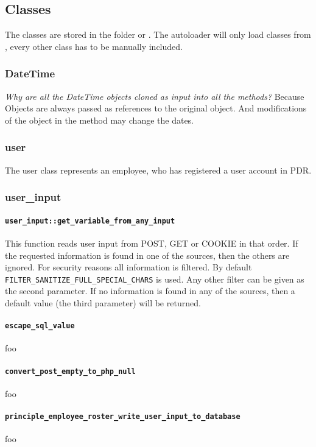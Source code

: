 \subsection{Classes}
The classes are stored in the folder  or .
The autoloader will only load classes from , every other class has to be manually included.

\subsubsection{DateTime}
\emph{Why are all the DateTime objects cloned as input into all the methods?}
Because Objects are always passed as references to the original object.
And modifications of the object in the method may change the dates.

\subsubsection{user}
The user class represents an employee, who has registered a user account in PDR.

\subsubsection{user\_input}
\paragraph{\lstinline|user_input::get_variable_from_any_input|}
This function reads user input from POST, GET or COOKIE in that order.
If the requested information is found in one of the sources, then the others are ignored.
For security reasons all information is filtered. By default \lstinline|FILTER_SANITIZE_FULL_SPECIAL_CHARS| is used. Any other filter can be given as the second parameter.
If no information is found in any of the sources, then a default value (the third parameter) will be returned.

\paragraph{\lstinline|escape_sql_value|} foo
\paragraph{\lstinline|convert_post_empty_to_php_null|} foo
\paragraph{\lstinline|principle_employee_roster_write_user_input_to_database|} foo
